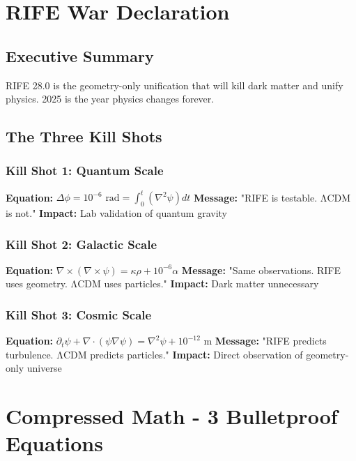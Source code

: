\documentclass[11pt]{report}
\begin{document}
\section{RIFE War Declaration}

\subsection{Executive Summary}
RIFE 28.0 is the geometry-only unification that will kill dark matter and unify physics. 2025 is the year physics changes forever.

\subsection{The Three Kill Shots}

\subsubsection{Kill Shot 1: Quantum Scale}
\textbf{Equation:} $\Delta\phi = 10^{-6} \text{ rad} = \int_0^t (\nabla^2\psi) dt$
\textbf{Message:} "RIFE is testable. ΛCDM is not."
\textbf{Impact:} Lab validation of quantum gravity

\subsubsection{Kill Shot 2: Galactic Scale}
\textbf{Equation:} $\nabla \times (\nabla \times \psi) = \kappa\rho + 10^{-6}\alpha$
\textbf{Message:} "Same observations. RIFE uses geometry. ΛCDM uses particles."
\textbf{Impact:} Dark matter unnecessary

\subsubsection{Kill Shot 3: Cosmic Scale}
\textbf{Equation:} $\partial_t\psi + \nabla \cdot (\psi\nabla\psi) = \nabla^2\psi + 10^{-12} \text{ m}$
\textbf{Message:} "RIFE predicts turbulence. ΛCDM predicts particles."
\textbf{Impact:} Direct observation of geometry-only universe

\section{Compressed Math - 3 Bulletproof Equations}
\end{document}
